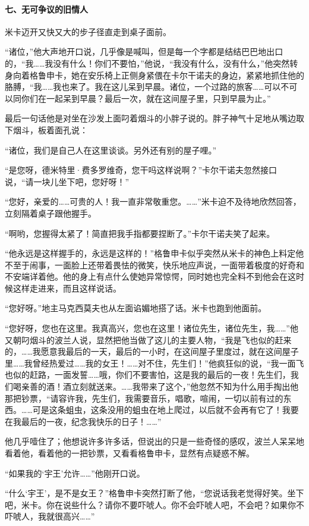 \paragraph*{七、无可争议的旧情人}
\par 米卡迈开又快又大的步子径直走到桌子面前。
\par “诸位，”他大声地开口说，几乎像是喊叫，但是每一个字都是结结巴巴地出口的，“我……我没有什么！你们不要怕，”他说，“我没有什么，没有什么，”他突然转身向着格鲁申卡，她在安乐椅上正侧身紧偎在卡尔干诺夫的身边，紧紧地抓住他的胳膊，“我……我也来了。我在这儿呆到早晨。诸位，一个过路的旅客……可以不可以同你们在一起呆到早晨？最后一次，就在这间屋子里，只到早晨为止。”
\par 最后一句话他是对坐在沙发上面叼着烟斗的小胖子说的。胖子神气十足地从嘴边取下烟斗，板着面孔说：
\par “诸位，我们是自己人在这里谈谈。另外还有别的屋子哩。”
\par “是您呀，德米特里·费多罗维奇，您干吗这样说啊？”卡尔干诺夫忽然接口说，“请一块儿坐下吧，您好呀！”
\par “您好，亲爱的……可贵的人！我一直非常敬重您。……”米卡迫不及待地欣然回答，立刻隔着桌子跟他握手。
\par “啊哟，您握得太紧了！简直把我手指都要捏断了。”卡尔干诺夫笑了起来。
\par “他永远是这样握手的，永远是这样的！”格鲁申卡似乎突然从米卡的神色上料定他不至于闹事，一面脸上还带着畏怯的微笑，快乐地应声说，一面带着极度的好奇和不安端详着他。他的身上有点什么使她异常惊愕，同时她也完全料不到他会在这时候这样走进来，而且这样说话。
\par “您好呀。”地主马克西莫夫也从左面谄媚地搭了话。米卡也跑到他面前。
\par “您好呀，您也在这里。我真高兴，您也在这里！诸位先生，诸位先生，我……”他又朝叼烟斗的波兰人说，显然把他当做了这儿的主要人物，“我是飞也似的赶来的，……我愿意我最后的一天，最后的一小时，在这间屋子里度过，就在这间屋子里……我曾经热爱过……我的女王！……对不住，先生们！”他疯狂似的说，“我一面飞也似的赶路，一面发誓……哦，你们不要害怕，这是我的最后的一夜！先生们，我们喝亲善的酒！酒立刻就送来。……我带来了这个，”他忽然不知为什么用手掏出他那把钞票，“请容许我，先生们，我需要音乐，唱歌，喧闹，一切以前有过的东西。……可是这条蛆虫，这条没用的蛆虫在地上爬过，以后就不会再有它了！我要在我最后的一夜，纪念我快乐的日子！……”
\par 他几乎噎住了；他想说许多许多话，但说出的只是一些奇怪的感叹，波兰人呆呆地看着他，看着他的一把钞票，又看看格鲁申卡，显然有点疑惑不解。
\par “如果我的‘宇王’允许……”他刚开口说。
\par “什么‘宇王’，是不是女王？”格鲁申卡突然打断了他，“您说话我老觉得好笑。坐下吧，米卡。你在说些什么？请你不要吓唬人。你不会吓唬人吧，不会吧？如果你不吓唬人，我就很高兴……”
